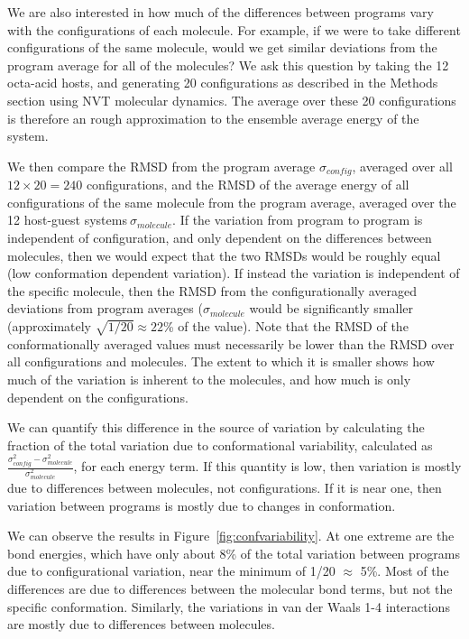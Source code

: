 We are also interested in how much of the differences between programs
vary with the configurations of each molecule. For example, if we were
to take different configurations of the same molecule, would we get
similar deviations from the program average for all of the molecules?
We ask this question by taking the 12 octa-acid hosts, and generating
20 configurations as described in the Methods section using NVT
molecular dynamics. The average over these 20 configurations is
therefore an rough approximation to the ensemble average energy of the
system.

We then compare the RMSD from the program average $\sigma_{config}$,
averaged over all $12 \times 20 = 240$ configurations, and the RMSD of
the average energy of all configurations of the same molecule from the
program average, averaged over the 12 host-guest
systems$~\sigma_{molecule}$. If the variation from program to program
is independent of configuration, and only dependent on the differences
between molecules, then we would expect that the two RMSDs would be
roughly equal (low conformation dependent variation).  If instead the
variation is independent of the specific molecule, then the RMSD from
the configurationally averaged deviations from program averages
($\sigma_{molecule}$ would be significantly smaller (approximately
$\sqrt{1/20} \approx 22$\% of the value). Note that the RMSD of the
conformationally averaged values must necessarily be lower than the
RMSD over all configurations and molecules. The extent to which it is
smaller shows how much of the variation is inherent to the molecules,
and how much is only dependent on the configurations.

We can quantify this difference in the source of variation by
calculating the fraction of the total variation due to conformational
variability, calculated as
$\frac{\sigma^2_{config}-\sigma^2_{molecule}}{\sigma^2_{molecule}}$,
for each energy term. If this quantity is low, then variation is
mostly due to differences between molecules, not configurations.  If
it is near one, then variation between programs is mostly due to
changes in conformation.

We can observe the results in Figure~\ref{fig:confvariability}. At one
extreme are the bond energies, which have only about 8\% of the total
variation between programs due to configurational variation, near the
minimum of 1/20 $\approx$ 5\%. Most of the differences are due to
differences between the molecular bond terms, but not the specific
conformation.  Similarly, the variations in van der Waals 1-4
interactions are mostly due to differences between molecules.

